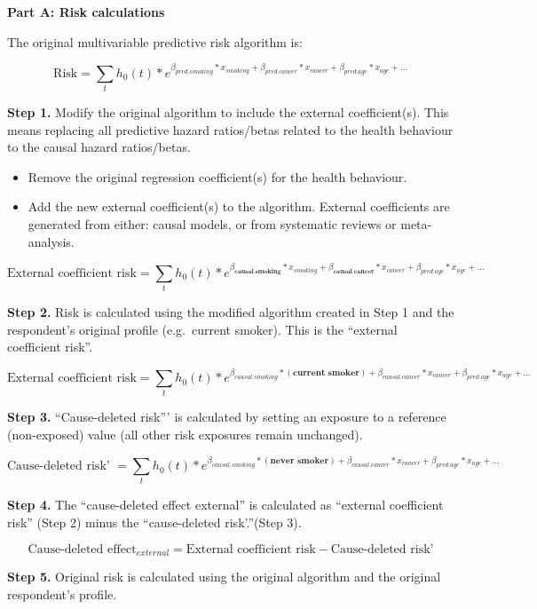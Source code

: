 \documentclass[]{book}
\providecommand{\tightlist}{%
  \setlength{\itemsep}{0pt}\setlength{\parskip}{0pt}}
\begin{document}
\textbf{Part A: Risk calculations}

The original multivariable predictive risk algorithm is:

\[ \text{Risk} = \sum_t h_0(t) * e^{\beta_{pred.smoking}*x_{smoking}+\beta_{pred.cancer}*x_{cancer} + \beta_{pred.age}*x_{age} +...}  \]

\textbf{Step 1.} Modify the original algorithm to include the external
coefficient(s). This means replacing all predictive hazard ratios/betas
related to the health behaviour to the causal hazard ratios/betas.

\begin{itemize}
\tightlist
\item
  Remove the original regression coefficient(s) for the health
  behaviour.
\item
  Add the new external coefficient(s) to the algorithm. External
  coefficients are generated from either: causal models, or from
  systematic reviews or meta-analysis.
\end{itemize}

\[ \text{External coefficient risk} = \sum_t h_0(t) * e^{{\beta_\textbf{causal.smoking}}*x_{smoking} + {{\beta_\textbf{causal.cancer}}}*x_{cancer} + \beta_{pred.age}*x_{age} +...}  \]

\textbf{Step 2.} Risk is calculated using the modified algorithm created
in Step 1 and the respondent's original profile (e.g.~current smoker).
This is the ``external coefficient risk''.

\[ \text{External coefficient risk} = \sum_t h_0(t) * e^{\beta_{causal.smoking}* {(\textbf{current smoker})} + \beta_{causal.cancer}*x_{cancer} + \beta_{pred.age}*x_{age} +...}  \]

\textbf{Step 3.} ``Cause-deleted risk''' is calculated by setting an
exposure to a reference (non-exposed) value (all other risk exposures
remain unchanged).

\[ \text{Cause-deleted risk' } = \sum_t h_0(t) * e^{\beta_{causal.smoking}* {(\textbf{never smoker})} + \beta_{causal.cancer}*x_{cancer} + \beta_{pred.age}*x_{age} +...}  \]

\textbf{Step 4.} The ``cause-deleted effect external'' is calculated as
``external coefficient risk'' (Step 2) minus the ``cause-deleted
risk'.''(Step 3).

\[\text{Cause-deleted effect}_{external} = \text{External coefficient risk} - \text{Cause-deleted risk'}\]

\textbf{Step 5.} Original risk is calculated using the original
algorithm and the original respondent's profile.
\end{document}
